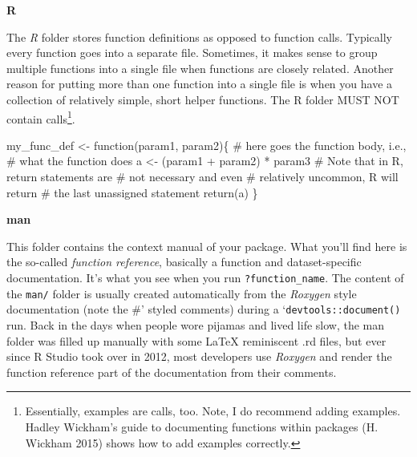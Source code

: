 \documentclass[
  12pt,
  letterpaper,
]{krantz}
\newenvironment{Shaded}{\begin{snugshade}}{\end{snugshade}}
\newcommand{\CommentTok}[1]{\textcolor[rgb]{0.37,0.37,0.37}{#1}}
\newcommand{\ControlFlowTok}[1]{\textcolor[rgb]{0.00,0.23,0.31}{#1}}
\newcommand{\FunctionTok}[1]{\textcolor[rgb]{0.28,0.35,0.67}{#1}}
\newcommand{\NormalTok}[1]{\textcolor[rgb]{0.00,0.23,0.31}{#1}}
\newcommand{\OtherTok}[1]{\textcolor[rgb]{0.00,0.23,0.31}{#1}}
\newcommand{\SpecialCharTok}[1]{\textcolor[rgb]{0.37,0.37,0.37}{#1}}
\begin{document}
\textbf{R}

The \emph{R} folder stores function definitions as opposed to function
calls. Typically every function goes into a separate file. Sometimes, it
makes sense to group multiple functions into a single file when
functions are closely related. Another reason for putting more than one
function into a single file is when you have a collection of relatively
simple, short helper functions. The R folder MUST NOT contain
calls\footnote{Essentially, examples are calls, too. Note, I do
  recommend adding examples. Hadley Wickham's guide to documenting
  functions within packages (H. Wickham 2015) shows how to add examples
  correctly.}.

\begin{Shaded}
\begin{Highlighting}[]
\NormalTok{my\_func\_def }\OtherTok{\textless{}{-}} \ControlFlowTok{function}\NormalTok{(param1, param2)\{}
  \CommentTok{\# here goes the function body, i.e.,}
  \CommentTok{\# what the function does}
\NormalTok{  a }\OtherTok{\textless{}{-}}\NormalTok{ (param1 }\SpecialCharTok{+}\NormalTok{ param2) }\SpecialCharTok{*}\NormalTok{ param3}
  \CommentTok{\# Note that in R, return statements are}
  \CommentTok{\# not necessary and even}
  \CommentTok{\# relatively uncommon, R will return}
  \CommentTok{\# the last unassigned statement}
  \FunctionTok{return}\NormalTok{(a)}
\NormalTok{\}}
\end{Highlighting}
\end{Shaded}

\textbf{man}

This folder contains the context manual of your package. What you'll
find here is the so-called \emph{function reference}, basically a
function and dataset-specific documentation. It's what you see when you
run \texttt{?function\_name}. The content of the \texttt{man/} folder is
usually created automatically from the \emph{Roxygen} style
documentation (note the \#' styled comments) during a
`\texttt{devtools::document()} run. Back in the days when people wore
pijamas and lived life slow, the man folder was filled up manually with
some LaTeX reminiscent .rd files, but ever since R Studio took over in
2012, most developers use \emph{Roxygen} and render the function
reference part of the documentation from their comments.
\end{document}
